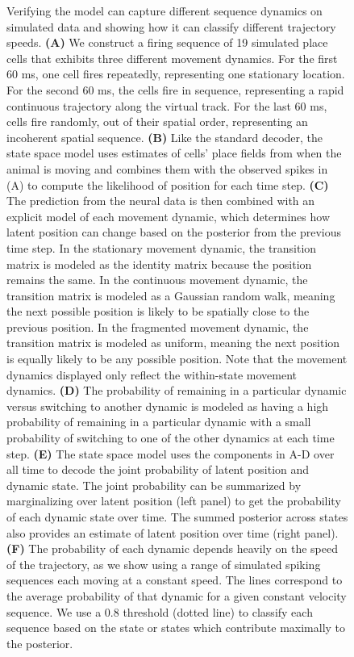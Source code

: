 \documentclass[times, twoside]{zHenriquesLab-StyleBioRxiv}
\begin{document}
\begin{figure}
\caption{Verifying the model can capture different sequence dynamics on simulated data and showing how it can classify different trajectory speeds. \textbf{(A)} We construct a firing sequence of 19 simulated place cells that exhibits three different movement dynamics. For the first 60 ms, one cell fires repeatedly, representing one stationary location. For the second 60 ms, the cells fire in sequence, representing a rapid continuous trajectory along the virtual track. For the last 60 ms, cells fire randomly, out of their spatial order, representing an incoherent spatial sequence. \textbf{(B)} Like the standard decoder, the state space model uses estimates of cells' place fields from when the animal is moving and combines them with the observed spikes in (A) to compute the likelihood of position for each time step. \textbf{(C)} The prediction from the neural data is then combined with an explicit model of each movement dynamic, which determines how latent position can change based on the posterior from the previous time step. In the stationary movement dynamic, the transition matrix is modeled as the identity matrix because the position remains the same. In the continuous movement dynamic, the transition matrix is modeled as a Gaussian random walk, meaning the next possible position is likely to be spatially close to the previous position. In the fragmented movement dynamic, the transition matrix is modeled as uniform, meaning the next position is equally likely to be any possible position. Note that the movement dynamics displayed only reflect the within-state movement dynamics. \textbf{(D)} The probability of remaining in a particular dynamic versus switching to another dynamic is modeled as having a high probability of remaining in a particular dynamic with a small probability of switching to one of the other dynamics at each time step. \textbf{(E)} The state space model uses the components in A-D over all time to decode the joint probability of latent position and dynamic state. The joint probability can be summarized by marginalizing over latent position (left panel) to get the probability of each dynamic state over time. The summed posterior across states also provides an estimate of latent position over time (right panel). \textbf{(F)} The probability of each dynamic depends heavily on the speed of the trajectory, as we show using a range of simulated spiking sequences each moving at a constant speed. The lines correspond to the average probability of that dynamic for a given constant velocity sequence. We use a 0.8  threshold (dotted line) to classify each sequence based on the state or states which contribute maximally to the posterior. 
}
\label{1}
\end{figure}
\end{document}
